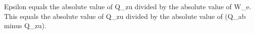Epsilon equals the absolute value of Q_zu divided by the absolute value of W_e.  
This equals the absolute value of Q_zu divided by the absolute value of (Q_ab minus Q_zu).
